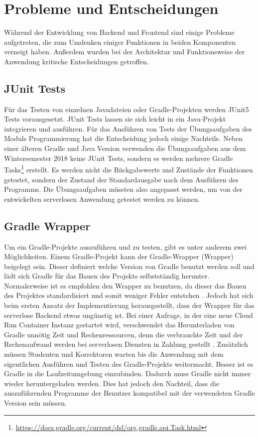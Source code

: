 \chapter{Probleme und Entscheidungen}
Während der Entwicklung von Backend und Frontend sind
einige Probleme aufgetreten, die zum Umdenken einiger Funktionen
in beiden Komponenten verneigt haben. Außerdem wurden bei der Architektur
und Funktionsweise der Anwendung kritische Entscheidungen getroffen.

\section{JUnit Tests}
Für das Testen von einzelnen Javadateien oder Gradle-Projekten werden
JUnit5 Tests vorausgesetzt. JUnit Tests lassen sie sich leicht in ein Java-Projekt integrieren und 
ausführen. Für das Ausführen von Tests der Übungsaufgaben des Moduls Programmierung
hat die Entscheidung jedoch einige Nachteile. Neben einer älteren Gradle und Java Version
verwenden die Übungsaufgaben aus dem Wintersemester 2018 keine JUnit Tests, sondern es werden
mehrere Gradle Tasks\footnote{\url{https://docs.gradle.org/current/dsl/org.gradle.api.Task.html}}
erstellt. Es werden nicht die Rückgabewerte und Zustände der Funktionen
getestet, sondern der Zustand der Standardausgabe nach dem Ausführen des Programms.
Die Übungsaufgaben müssten also angepasst werden, um von der entwickelten serverlosen 
Anwendung getestet werden zu können.

\section{Gradle Wrapper}
Um ein Gradle-Projekte auszuführen und
zu testen, gibt es unter anderem zwei Möglichkeiten.
Einem Gradle-Projekt kann der Gradle-Wrapper (Wrapper)
beigelegt sein. Dieser definiert welche Version von Gradle benutzt
werden soll und lädt sich Gradle für das Bauen des Projekts selbstständig herunter.
Normalerweise ist es empfohlen den Wrapper zu benutzen,
da dieser das Bauen des Projektes standardisiert und
somit weniger Fehler entstehen \cite{GradleWrapper}.
Jedoch hat sich beim ersten Ansatz der Implementierung herausgestellt, dass der
Wrapper für das serverlose Backend etwas ungünstig ist.
Bei einer Anfrage, in der eine neue Cloud Run Container Instanz
gestartet wird, verschwendet das Herunterladen von Gradle
unnötig Zeit und Rechenressourcen, denn die verbrauchte Zeit und der Rechenaufwand
werden bei serverlosen Diensten in Zahlung gestellt \cite{ServerlessTrends}.
Zusätzlich müssen Studenten und Korrektoren warten bis die Anwendung mit dem eigentlichen
Ausführen und Testen des Gradle-Projekts weitermacht.
Besser ist es Gradle in die Laufzeitumgebung einzubinden.
Dadurch muss Gradle nicht immer wieder heruntergeladen werden. Dies hat jedoch
den Nachteil, dass die auszuführenden Programme der Benutzer
kompatibel mit der verwendeten Gradle Version sein müssen.

